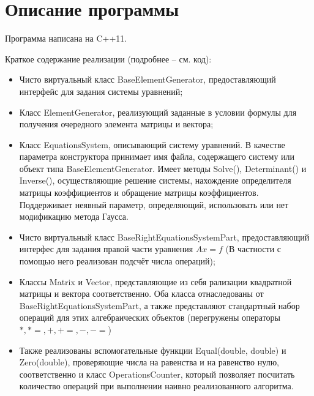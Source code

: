\newpage
\section{Описание программы}
Программа написана на C++11. \par
Краткое содержание реализации (подробнее -- см. код):
\begin{itemize}
    \item Чисто виртуальный класс BaseElementGenerator, предоставляющий интерфейс для задания системы уравнений;
    \item Класс ElementGenerator, реализующий заданные в условии формулы для получения очередного элемента матрицы и вектора;
    \item Класс EquationsSystem, описывающий систему уравнений. В качестве параметра конструктора принимает имя файла, содержащего систему или объект типа BaseElementGenerator.
        Имеет методы Solve(), Determinant() и Inverse(), осуществляющие решение системы, нахождение определителя матрицы коэффициентов и обращение матрицы коэффициентов.
        Поддерживает неявный параметр, определяющий, использовать или нет модификацию метода Гаусса.
    \item Чисто виртуальный класс BaseRightEquationsSystemPart, предоставляющий интерфес для задания правой части уравнения $Ax = f$ 
        (В частности с помощью него реализован подсчёт числа операций);
    \item Классы Matrix и Vector, представляющие из себя рализации квадратной матрицы и вектора соответственно. Оба класса отнаследованы от BaseRightEquationsSystemPart, а также 
        представляют стандартный набор операций для этих алгебраических объектов (перегружены операторы $*, *=, +, +=, -, -=$)
    \item Также реализованы вспомогательные функции Equal(double, double) и Zero(double), проверяющие числа на равенства и на равенство нулю, соответственно 
    и класс OperationsCounter, который позволяет посчитать количество операций при выполнении наивно реализованного алгоритма.
\end{itemize}
